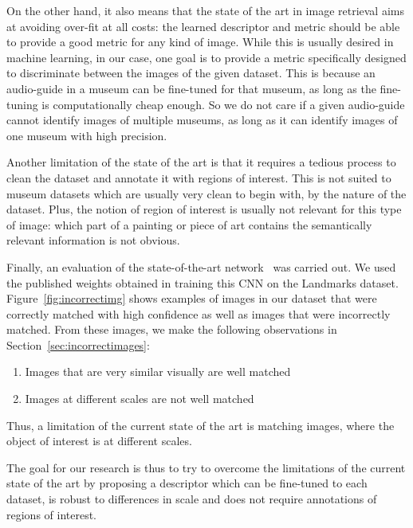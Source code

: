 On the other hand, it also means that the state of the art in
image retrieval aims at avoiding over-fit at all costs:
the learned descriptor and metric should
be able to provide a good metric for any kind of image.
While this is usually desired in machine learning, in our case,
one goal is to provide a metric specifically designed
to discriminate between the images of the given dataset. This is because
an audio-guide in a museum can be fine-tuned for that museum, as long
as the fine-tuning is computationally cheap enough. So we do not care
if a given audio-guide cannot identify images of multiple museums,
as long as it can identify images of one museum with high precision.

Another limitation of the state of the art is that it requires
a tedious process to clean the dataset and annotate it with regions of
interest. This is not suited to museum datasets which are usually very
clean to begin with, by the nature of the dataset. Plus, the notion of
region of interest is usually not relevant for this type of image:
which part of a painting or piece of art contains the semantically
relevant information is not obvious.

Finally, an evaluation of the state-of-the-art network~\cite{gordo_deep_2016}
was carried out.
We used the published weights obtained in training this CNN on the
Landmarks dataset.
Figure~\ref{fig:incorrectimg}
shows examples of images in our dataset that were correctly matched
with high confidence as well as images that were incorrectly matched.
From these images, we make the following observations in
Section~\ref{sec:incorrectimages}:

\begin{enumerate}
    \item Images that are very similar visually are well matched
    \item Images at different scales are not well matched
\end{enumerate}

Thus, a limitation of the current state of the art is matching
images, where the object of interest is at different scales.

The goal for our research is thus to try to overcome the limitations
of the current state of the art by proposing a descriptor which can
be fine-tuned to each dataset, is robust to differences in scale and
does not require annotations of regions of interest.
